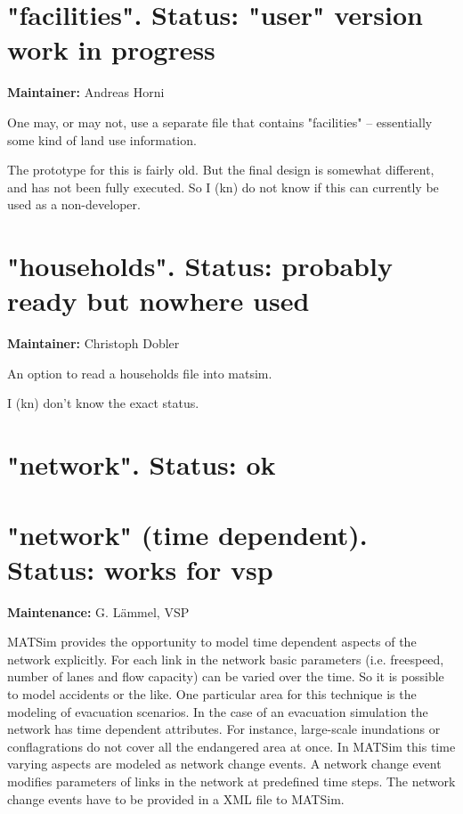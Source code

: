 \section{"facilities". Status: "user" version work in progress}

\textbf{Maintainer:} Andreas Horni

One may, or may not, use a separate file that contains "facilities" – essentially some kind of land use information.

The prototype for this is fairly old. But the final design is  somewhat different, and has not been fully executed. So I (kn) do  not know if this can currently be used as a non-developer.

\vfill\eject
\section{"households". Status: probably ready but nowhere used}

\textbf{Maintainer:} Christoph Dobler

An option to read a households file into matsim.

I (kn) don't know the exact status.

\vfill\eject
\section{"network". Status: ok}

\vfill\eject
\section{"network" (time dependent). Status: works for vsp}

\textbf{Maintenance:} G. Lämmel, VSP

MATSim provides the opportunity to model time dependent aspects of  the network explicitly. For each link in the network basic parameters  (i.e. freespeed, number of lanes and flow capacity) can be varied over  the time. So it is possible to model accidents or the like. One  particular area for this technique is the modeling of evacuation  scenarios.
In the case of an evacuation simulation the network has time dependent  attributes. For instance, large-scale inundations or conflagrations do  not cover all the endangered area at once.
In MATSim this time varying aspects are modeled as network change  events. A network change event modifies parameters of links in the  network at predefined time steps. The network change events have to be  provided in a XML file to MATSim.

